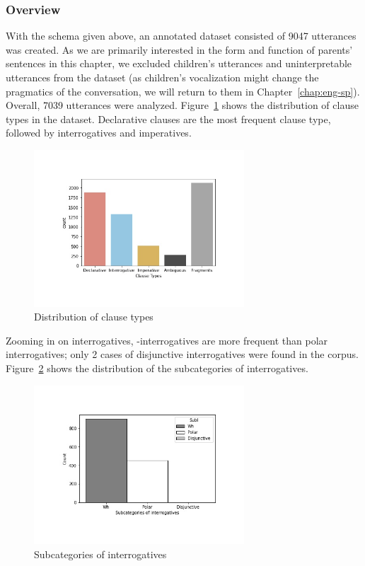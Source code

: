 \subsubsection{Overview}
With the schema given above, an annotated dataset consisted of 9047 utterances was created. As we are primarily interested in the form and function of parents' sentences in this chapter, we excluded children's utterances and uninterpretable utterances from the dataset (as children's vocalization might change the pragmatics of the conversation, we will return to them in Chapter~\ref{chap:eng-sp}). Overall, 7039 utterances were analyzed.  Figure~\ref{fig:real-cldist} shows the distribution of clause types in the dataset. Declarative clauses are the most frequent clause type, followed by interrogatives and imperatives. 


\begin{figure}[H]
    \centering
    \includegraphics[width=0.7\textwidth]{figures/real-cldist.jpg}
    \caption{Distribution of clause types}
    \label{fig:real-cldist}
\end{figure}


Zooming in on interrogatives, \twh-interrogatives are more frequent than polar interrogatives; only 2 cases of disjunctive interrogatives were found in the corpus. Figure~\ref{fig:real-subI} shows the distribution of the subcategories of interrogatives. 

\begin{figure}[H]
    \centering
    \includegraphics[width=0.7\textwidth]{figures/real-subI.jpg}
    \caption{Subcategories of interrogatives}
    \label{fig:real-subI}
\end{figure}


